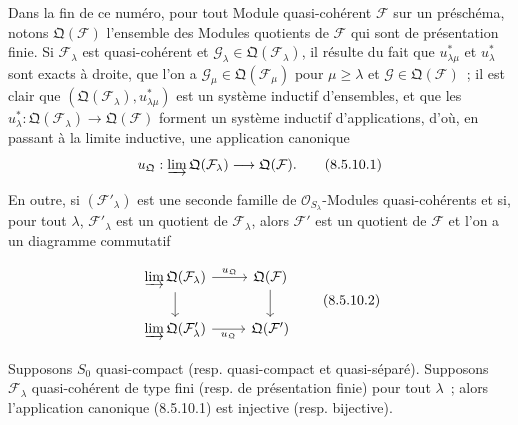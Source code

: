 \begin{env}[8.5.10]
\label{IV.8.5.10-fr}
Dans la fin de ce numéro, pour tout Module quasi-cohérent $\mathcal F$ sur un
préschéma, notons $\mathfrak Q(\mathcal F)$ l'ensemble des Modules quotients de
$\mathcal F$ qui sont de présentation finie. Si $\mathcal F_\lambda$ est
quasi-cohérent et $\mathcal G_\lambda\in\mathfrak Q(\mathcal F_\lambda)$, il
résulte du fait que $u_{\lambda\mu}^*$ et $u_\lambda^*$ sont exacts à droite,
que l'on a $\mathcal G_\mu\in\mathfrak Q(\mathcal F_\mu)$ pour
$\mu\geq\lambda$ et $\mathcal G\in\mathfrak Q(\mathcal F)$~; il est clair que
$(\mathfrak Q(\mathcal F_\lambda),u_{\lambda\mu}^*)$ est un système inductif
d'ensembles, et que les
$u_\lambda^*:\mathfrak Q(\mathcal F_\lambda)\to\mathfrak Q(\mathcal F)$
forment un système inductif d'applications, d'où, en passant à la limite
inductive, une application canonique
\begin{equation}
  u_{\mathfrak Q}:\varinjlim\mathfrak Q(\mathcal F_\lambda)
  \longrightarrow\mathfrak Q(\mathcal F).
  \tag{8.5.10.1}\label{IV.8.5.10.1-fr}
\end{equation}

En outre, si $(\mathcal F'_\lambda)$ est une seconde famille de
$\mathcal O_{S_\lambda}$-Modules quasi-cohérents et si, pour tout $\lambda$,
$\mathcal F'_\lambda$ est un quotient de $\mathcal F_\lambda$, alors
$\mathcal F'$ est un quotient de $\mathcal F$ et l'on a un diagramme
commutatif

\[
\begin{tikzcd}
\varinjlim\mathfrak Q(\mathcal F_\lambda)
  \ar[r,"u_{\mathfrak Q}"] \ar[d]
  & \mathfrak Q(\mathcal F) \ar[d] \\
\varinjlim\mathfrak Q(\mathcal F'_\lambda)
  \ar[r,"u_{\mathfrak Q}"']
  & \mathfrak Q(\mathcal F')
\end{tikzcd}
\tag{8.5.10.2}\label{IV.8.5.10.2-fr}
\]
\end{env}

\begin{proposition}[8.5.11]
\label{IV.8.5.11-fr}
Supposons $S_0$ quasi-compact (resp. quasi-compact et quasi-séparé). Supposons
$\mathcal F_\lambda$ quasi-cohérent de type fini (resp. de présentation finie)
pour tout $\lambda$~; alors l'application canonique (8.5.10.1) est injective
(resp. bijective).
\end{proposition}

